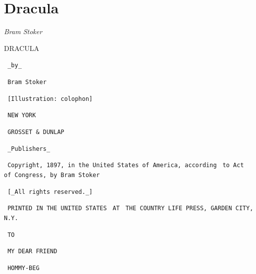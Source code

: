 \documentclass[12pt,openright]{book}
\begin{document}

%



\mainmatter
\pagestyle{fancy}


\chapter*{Dracula}

\textit{Bram Stoker}

DRACULA

\texttt{                              \_by\_}

\texttt{                          Bram Stoker}

\texttt{                    [Illustration: colophon]}

\texttt{                            NEW YORK}

\texttt{                        GROSSET \& DUNLAP}

\texttt{                          \_Publishers\_}

\texttt{  Copyright, 1897, in the United States of America, according}
\texttt{               to Act of Congress, by Bram Stoker}

\texttt{                    [\_All rights reserved.\_]}

\texttt{                  PRINTED IN THE UNITED STATES}
\texttt{                               AT}
\texttt{           THE COUNTRY LIFE PRESS, GARDEN CITY, N.Y.}




\texttt{                               TO}

\texttt{                         MY DEAR FRIEND}

\texttt{                           HOMMY-BEG}
\end{document}
